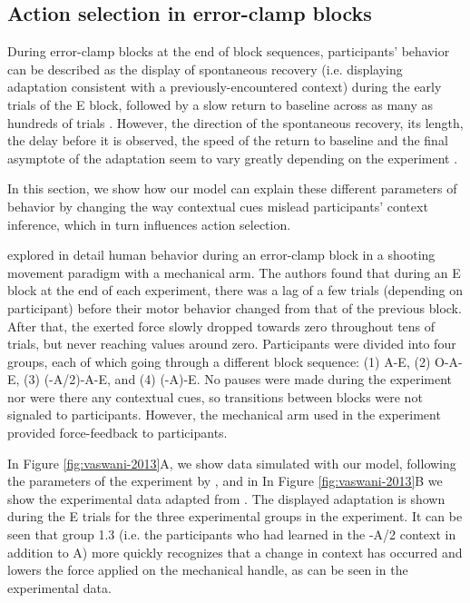 \documentclass[a4paper,doc,floatsintext,natbib]{apa6}
\def \fref #1{Figure \ref{#1}}     %
\begin{document}
\subsection{Action selection in error-clamp blocks}
During error-clamp blocks at the end of block sequences, participants' behavior can be described as the display of spontaneous recovery (i.e. displaying adaptation consistent with a previously-encountered context) during the early trials of the E block, followed by a slow return to baseline across as many as hundreds of trials \citep{Brennan_Decay_2015}. However, the direction of the spontaneous recovery, its length, the delay before it is observed, the speed of the return to baseline and the final asymptote of the adaptation seem to vary greatly depending on the experiment \citep{Brennan_Decay_2015,Vaswani_Decay_2013,Smith_Interacting_2006,Shmuelof_Overcoming_2012}.

In this section, we show how our model can explain these different parameters of behavior by changing the way contextual cues mislead participants' context inference, which in turn influences action selection.

\cite{Vaswani_Decay_2013} explored in detail human behavior during an error-clamp block in a shooting movement paradigm with a mechanical arm. The authors found that during an E block at the end of each experiment, there was a lag of a few trials (depending on participant) before their motor behavior changed from that of the previous block. After that, the exerted force slowly dropped towards zero throughout tens of trials, but never reaching values around zero. Participants were divided into four groups, each of which going through a different block sequence: (1) A-E, (2) O-A-E, (3) (-A/2)-A-E, and (4) (-A)-E. No pauses were made during the experiment nor were there any contextual cues, so transitions between blocks were not signaled to participants. However, the mechanical arm used in the experiment provided force-feedback to participants.

In \fref{fig:vaswani-2013}A, we show data simulated with our model, following the parameters of the experiment by \cite{Vaswani_Decay_2013}, and in In \fref{fig:vaswani-2013}B we show the experimental data adapted from \cite{Vaswani_Decay_2013}. The displayed adaptation is shown during the E trials for the three experimental groups in the experiment. It can be seen that group 1.3 (i.e. the participants who had learned in the -A/2 context in addition to A) more quickly recognizes that a change in context has occurred and lowers the force applied on the mechanical handle, as can be seen in the experimental data.
\end{document}
